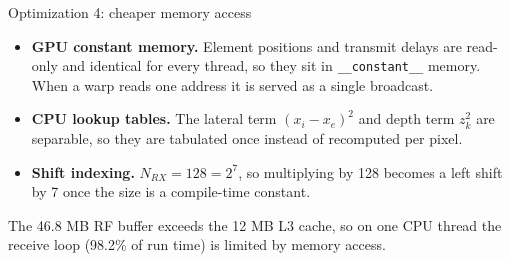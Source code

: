 \documentclass[aspectratio=169,10pt]{beamer}
\begin{document}
\begin{frame}{Optimization 4: cheaper memory access}
  \begin{itemize}\setlength\itemsep{.8em}
    \item \textbf{GPU constant memory.} Element positions and transmit delays are read-only and identical for every thread, so they sit in \texttt{\_\_constant\_\_} memory. When a warp reads one address it is served as a single broadcast.
    \item \textbf{CPU lookup tables.} The lateral term $(x_i-x_e)^2$ and depth term $z_k^2$ are separable, so they are tabulated once instead of recomputed per pixel.
    \item \textbf{Shift indexing.} $N_{RX}=128=2^7$, so multiplying by 128 becomes a left shift by 7 once the size is a compile-time constant.
  \end{itemize}
  \medskip
  {\small The 46.8 MB RF buffer exceeds the 12 MB L3 cache, so on one CPU thread the receive loop (98.2\% of run time) is limited by memory access.}
\end{frame}
\end{document}
